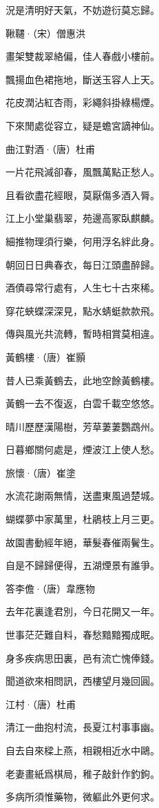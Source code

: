 \documentclass[12pt,a4paper]{ctexbook}
\begin{document}
況是清明好天氣，不妨遊衍莫忘歸。\par
鞦韆·（宋）僧惠洪\par
畫架雙裁翠絡偏，佳人春戲小樓前。\par
飄揚血色裙拖地，斷送玉容人上天。\par
花皮潤沾紅杏雨，彩繩斜掛綠楊煙。\par
下來閒處從容立，疑是蟾宮謫神仙。\par
曲江對酒·（唐）杜甫\par
一片花飛減卻春，風飄萬點正愁人。\par
且看欲盡花經眼，莫厭傷多酒入脣。\par
江上小堂巢翡翠，苑邊高冢臥麒麟。\par
細推物理須行樂，何用浮名絆此身。\par
朝回日日典春衣，每日江頭盡醉歸。\par
酒債尋常行處有，人生七十古來稀。\par
穿花蛺蝶深深見，點水蜻蜓款款飛。\par
傳與風光共流轉，暫時相賞莫相違。\par
黃鶴樓·（唐）崔顥\par
昔人已乘黃鶴去，此地空餘黃鶴樓。\par
黃鶴一去不復返，白雲千載空悠悠。\par
晴川歷歷漢陽樹，芳草萋萋鸚鵡州。\par
日暮鄉關何處是，煙波江上使人愁。\par
旅懷·（唐）崔塗\par
水流花謝兩無情，送盡東風過楚城。\par
蝴蝶夢中家萬里，杜鵑枝上月三更。\par
故園書動經年絕，華髮春催兩鬢生。\par
自是不歸歸便得，五湖煙景有誰爭。\par
答李儋·（唐）韋應物\par
去年花裏逢君別，今日花開又一年。\par
世事茫茫難自料，春愁黯黯獨成眠。\par
身多疾病思田裏，邑有流亡愧俸錢。\par
聞道欲來相問訊，西樓望月幾回圓。\par
江村·（唐）杜甫\par
清江一曲抱村流，長夏江村事事幽。\par
自去自來樑上燕，相親相近水中鷗。\par
老妻畫紙爲棋局，稚子敲針作釣鉤。\par
多病所須惟藥物，微軀此外更何求。\par
\end{document}
